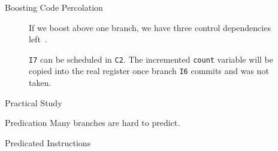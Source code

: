 \documentclass[presentation]{beamer}
\begin{document}
\begin{frame}{Boosting Code Percolation}
    \begin{center}
    \begin{minipage}{.52\textwidth}
        \begin{figure}[H]
            \centering
            
            \caption{If we boost above one branch, we have three control dependencies left~\cite{chang95}.}
            \label{fig:boosting_cfg}
    \end{figure}
    \end{minipage}\hfill
    \begin{minipage}{.46\textwidth}
    \begin{figure}[H]
            \centering
            \resizebox{1\textwidth}{!}{
            
        }
        \caption{\texttt{I7} can be scheduled in \texttt{C2}. The incremented \texttt{count} variable will be copied into the real register once branch \texttt{I6} commits and was not taken.}
        \label{fig:boosted_motion}
    \end{figure}
    \end{minipage}
    \end{center} 
\end{frame}

\begin{frame}{Practical Study}
    \begin{center}
        \resizebox{0.65\columnwidth}{!}{
            
        }
    \end{center} 
\end{frame}

\begin{frame}{Predication}
    \centering
    \LARGE Many branches are hard to predict.
\end{frame}

\begin{frame}{Predicated Instructions}
\begin{center}
\end{center}
\end{frame}
\end{document}

